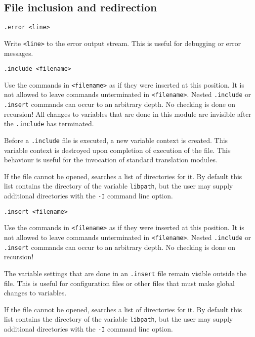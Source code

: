 \subsection{File inclusion and redirection}
\begin{verbatim}
.error <line>
\end{verbatim}
\begin{desc}
Write \texttt{<line>} to the error output stream.
This is useful for debugging or error messages.
\end{desc}
\begin{verbatim}
.include <filename>
\end{verbatim}
\begin{desc}
Use the {\Tm} commands in \texttt{<filename>} as if they were inserted at
this position.
It is not allowed to leave commands unterminated in \texttt{<filename>}.
Nested \texttt{.include} or \texttt{.insert} commands can occur to an arbitrary depth.
No checking is done on recursion!
All changes to variables that are done in this module are invisible after
the \texttt{.include} has terminated.

Before a \verb'.include' file is executed, a new variable context is
created. This variable context is destroyed upon completion of execution
of the file. This behaviour is useful for the invocation of standard
translation modules.

If the file cannot be opened, {\Tm} searches a list of directories for it.
By default this list contains the directory of the variable
\verb+libpath+, but the user may supply additional directories with the
\verb+-I+ command line option.
\end{desc}
\begin{verbatim}
.insert <filename>
\end{verbatim}
\begin{desc}
Use the {\Tm} commands in \texttt{<filename>} as if they were inserted at
this position.
It is not allowed to leave commands unterminated in \texttt{<filename>}.
Nested \texttt{.include} or \texttt{.insert}
commands can occur to an arbitrary depth.
No checking is done on recursion!

The variable settings that are done in an \texttt{.insert}
file remain visible outside the file.
This is useful for configuration files or other files that
must make global changes to variables.

If the file cannot be opened, {\Tm} searches a list of directories for it.
By default this list contains the directory of the variable
\verb+libpath+, but the user may supply additional directories with the
\verb+-I+ command line option.
\end{desc}
